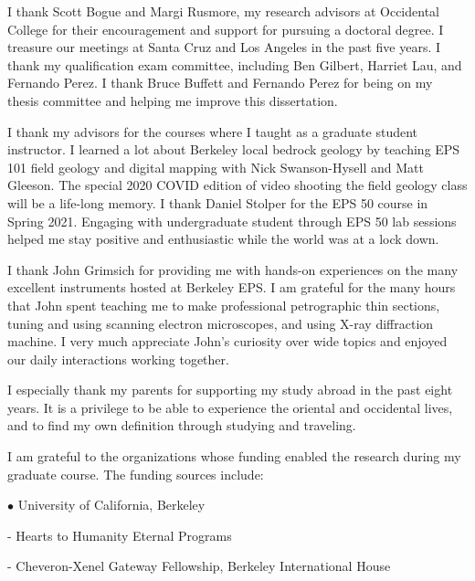 \documentclass{ucbthesis}
\begin{document}
\begin{frontmatter}
\begin{acknowledgements}
I thank Scott Bogue and Margi Rusmore, my research advisors at Occidental College for their encouragement and support for pursuing a doctoral degree. I treasure our meetings at Santa Cruz and Los Angeles in the past five years. I thank my qualification exam committee, including Ben Gilbert, Harriet Lau, and Fernando Perez. I thank Bruce Buffett and Fernando Perez for being on my thesis committee and helping me improve this dissertation. 

I thank my advisors for the courses where I taught as a graduate student instructor. I learned a lot about Berkeley local bedrock geology by teaching EPS 101 field geology and digital mapping with Nick Swanson-Hysell and Matt Gleeson. The special 2020 COVID edition of video shooting the field geology class will be a life-long memory. I thank Daniel Stolper for the EPS 50 course in Spring 2021. Engaging with undergraduate student through EPS 50 lab sessions helped me stay positive and enthusiastic while the world was at a lock down. 

I thank John Grimsich for providing me with hands-on experiences on the many excellent instruments hosted at Berkeley EPS. I am grateful for the many hours that John spent teaching me to make professional petrographic thin sections, tuning and using scanning electron microscopes, and using X-ray diffraction machine. I very much appreciate John's curiosity over wide topics and enjoyed our daily interactions working together. 

I especially thank my parents for supporting my study abroad in the past eight years. It is a privilege to be able to experience the oriental and occidental lives, and to find my own definition through studying and traveling. 

I am grateful to the organizations whose funding enabled the research during my graduate course. The funding sources include:

\vspace{5mm}
$\bullet$ University of California, Berkeley
    \vspace{5mm}

    \hspace{\parindent} - Hearts to Humanity Eternal Programs
    \vspace{5mm}
    
    \hspace{\parindent} - Cheveron-Xenel Gateway Fellowship, Berkeley International House
    \vspace{5mm}
    

\end{acknowledgements}
\end{frontmatter}
\end{document}
